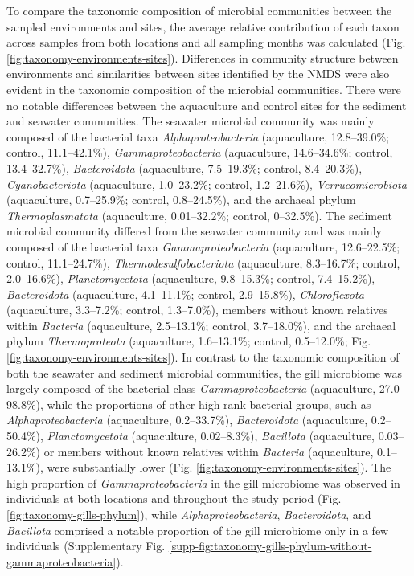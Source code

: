 \documentclass[
  12 pt,
]{article}
\begin{document}
To compare the taxonomic composition of microbial communities between the sampled environments and sites, the average relative contribution of each taxon across samples from both locations and all sampling months was calculated (Fig. \ref{fig:taxonomy-environments-sites}). Differences in community structure between environments and similarities between sites identified by the NMDS were also evident in the taxonomic composition of the microbial communities. There were no notable differences between the aquaculture and control sites for the sediment and seawater communities. The seawater microbial community was mainly composed of the bacterial taxa \emph{Alphaproteobacteria} (aquaculture, 12.8--39.0\unit{\percent}; control, 11.1--42.1\unit{\percent}), \emph{Gammaproteobacteria} (aquaculture, 14.6--34.6\unit{\percent}; control, 13.4--32.7\unit{\percent}), \emph{Bacteroidota} (aquaculture, 7.5--19.3\unit{\percent}; control, 8.4--20.3\unit{\percent}), \emph{Cyanobacteriota} (aquaculture, 1.0--23.2\unit{\percent}; control, 1.2--21.6\unit{\percent}), \emph{Verrucomicrobiota} (aquaculture, 0.7--25.9\unit{\percent}; control, 0.8--24.5\unit{\percent}), and the archaeal phylum \emph{Thermoplasmatota} (aquaculture, 0.01--32.2\unit{\percent}; control, 0--32.5\unit{\percent}). The sediment microbial community differed from the seawater community and was mainly composed of the bacterial taxa \emph{Gammaproteobacteria} (aquaculture, 12.6--22.5\unit{\percent}; control, 11.1--24.7\unit{\percent}), \emph{Thermodesulfobacteriota} (aquaculture, 8.3--16.7\unit{\percent}; control, 2.0--16.6\unit{\percent}), \emph{Planctomycetota} (aquaculture, 9.8--15.3\unit{\percent}; control, 7.4--15.2\unit{\percent}), \emph{Bacteroidota} (aquaculture, 4.1--11.1\unit{\percent}; control, 2.9--15.8\unit{\percent}), \emph{Chloroflexota} (aquaculture, 3.3--7.2\unit{\percent}; control, 1.3--7.0\unit{\percent}), members without known relatives within \emph{Bacteria} (aquaculture, 2.5--13.1\unit{\percent}; control, 3.7--18.0\unit{\percent}), and the archaeal phylum \emph{Thermoproteota} (aquaculture, 1.6--13.1\unit{\percent}; control, 0.5--12.0\unit{\percent}; Fig. \ref{fig:taxonomy-environments-sites}). In contrast to the taxonomic composition of both the seawater and sediment microbial communities, the gill microbiome was largely composed of the bacterial class \emph{Gammaproteobacteria} (aquaculture, 27.0--98.8\unit{\percent}), while the proportions of other high-rank bacterial groups, such as \emph{Alphaproteobacteria} (aquaculture, 0.2--33.7\unit{\percent}), \emph{Bacteroidota} (aquaculture, 0.2--50.4\unit{\percent}), \emph{Planctomycetota} (aquaculture, 0.02--8.3\unit{\percent}), \emph{Bacillota} (aquaculture, 0.03--26.2\unit{\percent}) or members without known relatives within \emph{Bacteria} (aquaculture, 0.1--13.1\unit{\percent}), were substantially lower (Fig. \ref{fig:taxonomy-environments-sites}). The high proportion of \emph{Gammaproteobacteria} in the gill microbiome was observed in individuals at both locations and throughout the study period (Fig. \ref{fig:taxonomy-gills-phylum}), while \emph{Alphaproteobacteria}, \emph{Bacteroidota}, and \emph{Bacillota} comprised a notable proportion of the gill microbiome only in a few individuals (Supplementary Fig. \ref{supp-fig:taxonomy-gills-phylum-without-gammaproteobacteria}).
\end{document}
